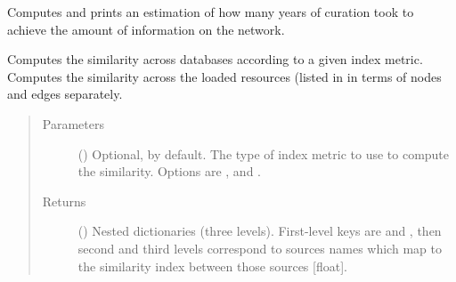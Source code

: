 \documentclass[letterpaper,10pt,english]{sphinxmanual}
\begin{document}
\begin{fulllineitems}

\begin{fulllineitems}
\label{\detokenize{main:pypath.main.PyPath.curators_work}}
Computes and prints an estimation of how many years of curation
took to achieve the amount of information on the network.

\end{fulllineitems}


\begin{fulllineitems}
\label{\detokenize{main:pypath.main.PyPath.databases_similarity}}
Computes the similarity across databases according to a given
index metric. Computes the similarity across the loaded
resources (listed in  in
terms of nodes and edges separately.
\begin{quote}\begin{description}
\item[{Parameters}] \leavevmode
{} () \textendash{} Optional,  by default. The type of index metric
to use to compute the similarity. Options are ,
 and .

\item[{Returns}] \leavevmode
() \textendash{} Nested dictionaries (three levels). First-level
keys are  and , then second and third
levels correspond to sources names which map to the
similarity index between those sources {[}float{]}.

\end{description}\end{quote}

\end{fulllineitems}



\end{fulllineitems}
\end{document}
